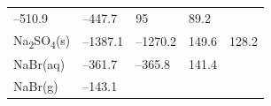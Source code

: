 \documentclass[
  9pt,
]{extbook}
\theoremstyle{definition}
\theoremstyle{definition}
\theoremstyle{definition}
\theoremstyle{remark}
\begin{document}
\begin{longtable}[]{@{}lllll@{}}
\begin{minipage}[t]{0.19\columnwidth}
--510.9\strut
\end{minipage} & \begin{minipage}[t]{0.20\columnwidth}\raggedright
--447.7\strut
\end{minipage} & \begin{minipage}[t]{0.18\columnwidth}\raggedright
95\strut
\end{minipage} & \begin{minipage}[t]{0.18\columnwidth}\raggedright
89.2\strut
\end{minipage}\tabularnewline
\begin{minipage}[t]{0.10\columnwidth}\raggedright
Na\textsubscript{2}SO\textsubscript{4}(s)\strut
\end{minipage} & \begin{minipage}[t]{0.19\columnwidth}\raggedright
--1387.1\strut
\end{minipage} & \begin{minipage}[t]{0.20\columnwidth}\raggedright
--1270.2\strut
\end{minipage} & \begin{minipage}[t]{0.18\columnwidth}\raggedright
149.6\strut
\end{minipage} & \begin{minipage}[t]{0.18\columnwidth}\raggedright
128.2\strut
\end{minipage}\tabularnewline
\begin{minipage}[t]{0.10\columnwidth}\raggedright
NaBr(aq)\strut
\end{minipage} & \begin{minipage}[t]{0.19\columnwidth}\raggedright
--361.7\strut
\end{minipage} & \begin{minipage}[t]{0.20\columnwidth}\raggedright
--365.8\strut
\end{minipage} & \begin{minipage}[t]{0.18\columnwidth}\raggedright
141.4\strut
\end{minipage} & \begin{minipage}[t]{0.18\columnwidth}\raggedright
\strut
\end{minipage}\tabularnewline
\begin{minipage}[t]{0.10\columnwidth}\raggedright
NaBr(g)\strut
\end{minipage} & \begin{minipage}[t]{0.19\columnwidth}\raggedright
--143.1\strut
\end{minipage} & \begin{minipage}[t]{0.20\columnwidth}\raggedright

\end{minipage}
\end{longtable}
\end{document}

